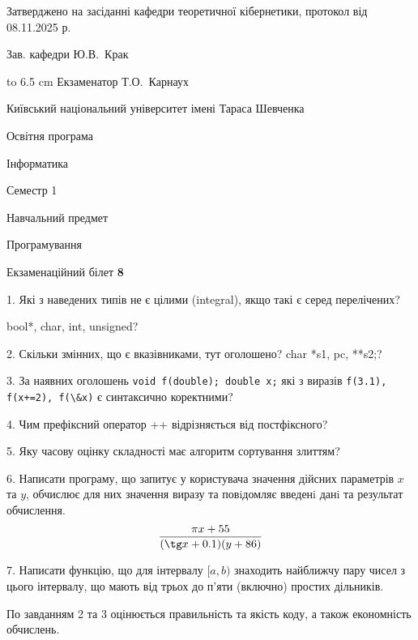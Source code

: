 \documentclass[12pt, ukrainian]{article}
\def\code#1{\Verb!#1!}
\begin{document}
{\smallskip\smallskip \begin {scriptsize} Затверджено на засіданні кафедри теоретичної кібернетики, протокол   від   08.11.2025 р.\par\smallskip\smallskip\smallskip\smallskip
{\parbox {6.5 cm} {Зав. кафедри \dotfill Ю.В.~Крак}}\hspace {0.7cm} {\hbox to 6.5 cm { Екзаменатор \dotfill Т.О.~Карнаух}} \end{scriptsize}}
\vspace{0.9cm}
{{\begin {scriptsize}\par
{ \center  Київський національний університет імені Тараса Шевченка \par}
{\parbox {5 cm}{Освітня програма \hfill}{\parbox {7 cm}{Інформатика\hfill}}\parbox {6 cm}{\hfill Семестр 1}}\par
{\parbox {5 cm} {Навчальний предмет \hfill}\parbox {7 cm}{Програмування \hfill}\parbox {6cm}{\hfill}\par}\vspace{-15pt} \end{scriptsize}}{\center Екзаменаційний білет \No \textbf { 8 }\par}}
{%
1. Які з наведених типів не є цілими (integral), якщо такі є серед перелічених?

bool*, char, int, unsigned?
\par
\vspace{2mm}
2. Скільки змінних, що є вказівниками, тут оголошено?
char *s1, pc, **s2;?
\par
\vspace{2mm}
3. За наявних оголошень \code{void f(double); double x;} які з виразів \code{f(3.1), f(x+=2), f(\&x)} є синтаксично коректними?
\par
\vspace{2mm}
4. Чим префіксний оператор ++ відрізняється від постфіксного?
\par
\vspace{2mm}
5. Яку часову оцінку складності має алгоритм сортування злиттям?
\par
\vspace{2mm}
6. Написати програму, що запитує у користувача значення дійсних параметрів $x$ та $y$, обчислює для них значення виразу та повiдомляє введенi данi та результат обчислення.
$$\frac{\pi x + 55}{(\tg x + 0.1) (y + 86)}$$ 

\par
7. Написати функцію, що для інтервалу $[a, b)$ знаходить найближчу пару чисел з цього інтервалу, що мають від трьох до п'яти (включно) простих дільників.

По завданням 2 та 3 оцінюється правильність та якість коду, а також економність обчислень.

}
\end{document}

